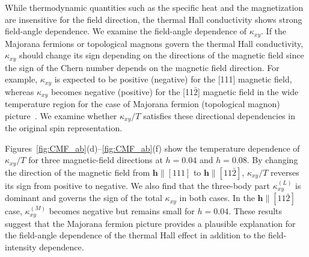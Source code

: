 \documentclass[twocolumn,superscriptaddress,showpacs, longbibliography, aps, prb]{revtex4-2}
\def\vec#1{\boldsymbol #1}
\newcommand{\blue}[1]{\textcolor{blue}{#1}}
\newcommand{\orange}[1]{\textcolor{orange}{#1}}
\begin{document}
While thermodynamic quantities such as the specific heat and the magnetization %
are insensitive for the field direction, the thermal Hall conductivity shows strong field-angle dependence.
We examine the field-angle dependence %
of $\kappa_{xy}$. 
If the Majorana fermions or topological magnons govern the thermal Hall conductivity,
$\kappa_{xy}$ should change its sign %
depending on the directions of the magnetic field
since the sign of the Chern number depends on the magnetic field direction.
For example, %
$\kappa_{xy}$ %
is expected to be positive (negative) for the [111] magnetic field, %
whereas $\kappa_{xy}$ becomes negative (positive) for the [11$\bar{2}$] magnetic field in the wide temperature region for the case of Majorana fermion (topological magnon) picture~\cite{McClarty_PRB2018, Joshi_PRB2018, ChernZK2021}.
We %
examine whether $\kappa_{xy}/T$ satisfies these
directional dependencies in the original spin representation. %

Figures~\ref{fig:CMF_ab}(d)--\ref{fig:CMF_ab}(f) show the temperature dependence of $\kappa_{xy}/T$ for three magnetic-field directions at $h = 0.04$ and $h=0.08$. %
By changing the direction of the magnetic field from $\vec{h}\parallel [111]$ to  $\vec{h}\parallel [11\bar{2}]$, 
$\kappa_{xy}/T$ %
reverses its sign
from positive to negative. 
We also find that the three-body part $\kappa_{xy}^{(L)}$ is dominant and governs the sign of the total $\kappa_{xy}$ in both cases. In the $\vec{h}\parallel [11\bar{2}]$ case,
$\kappa_{xy}^{(M)}$ becomes negative but remains small for $h=0.04$. %
These results suggest that the Majorana fermion picture %
provides a plausible explanation for 
the field-angle dependence of the thermal Hall effect in addition to the field-intensity dependence.
\end{document}
